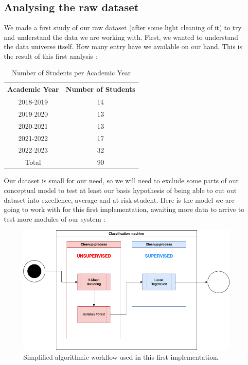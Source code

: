 \documentclass[../main.tex]{subfiles}
\begin{document}
\subsection{Analysing the raw dataset}
We made a first study of our raw dataset (after some light cleaning of it) to try and understand the data we are working with. First, we wanted to understand the data universe itself. How many entry have we available on our hand. This is the result of this first analysis :
\begin{table}[H]
  \centering
  \caption{Number of Students per Academic Year}
  \begin{tabular}{|c|c|}
    \hline
    Academic Year & Number of Students \\
    \hline
    2018-2019 & 14 \\
    2019-2020 & 13 \\
    2020-2021 & 13 \\
    2021-2022 & 17 \\
    2022-2023 & 32 \\
    \hline
    Total & 90 \\
    \hline
  \end{tabular}
  
  \label{tab:students_per_year}
\end{table}

Our dataset is small for our need, so we will need to exclude some parts of our conceptual model to test at least our basis hypothesis of being able to cut out dataset into excellence, average and at risk student.
Here is the model we are going to work with for this first implementation, awaiting more data to arrive to test more modules of our system : 

\begin{figure}[H]      
    \includegraphics[width=1\linewidth]{res//diagram/simplifiedmdl-Imp_mdl.drawio.png}
    \caption{Simplified algorithmic workflow used in this first implementation.}
    \label{fig:dataworkflow_simp} %
\end{figure}
\end{document}
